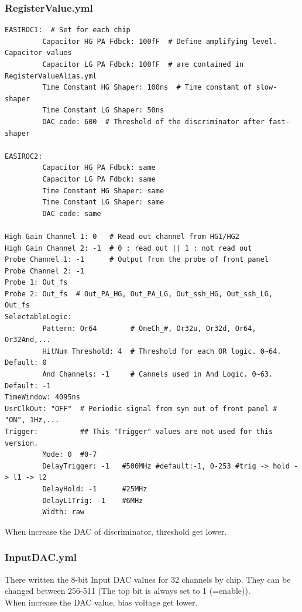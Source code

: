 \subsubsection{RegisterValue.yml}

\begin{shadebox}
\begin{verbatim}
EASIROC1:  # Set for each chip
         Capacitor HG PA Fdbck: 100fF  # Define amplifying level. Capacitor values
         Capacitor LG PA Fdbck: 100fF  # are contained in RegisterValueAlias.yml
         Time Constant HG Shaper: 100ns  # Time constant of slow-shaper
         Time Constant LG Shaper: 50ns
         DAC code: 600  # Threshold of the discriminator after fast-shaper
 
EASIROC2:
         Capacitor HG PA Fdbck: same
         Capacitor LG PA Fdbck: same
         Time Constant HG Shaper: same
         Time Constant LG Shaper: same
         DAC code: same
 
High Gain Channel 1: 0   # Read out channel from HG1/HG2
High Gain Channel 2: -1  # 0 : read out || 1 : not read out
Probe Channel 1: -1      # Output from the probe of front panel
Probe Channel 2: -1
Probe 1: Out_fs
Probe 2: Out_fs  # Out_PA_HG, Out_PA_LG, Out_ssh_HG, Out_ssh_LG, Out_fs
SelectableLogic:
         Pattern: Or64        # OneCh_#, Or32u, Or32d, Or64, Or32And,...
         HitNum Threshold: 4  # Threshold for each OR logic. 0~64. Default: 0
         And Channels: -1     # Cannels used in And Logic. 0~63. Default: -1
TimeWindow: 4095ns
UsrClkOut: "OFF"  # Periodic signal from syn out of front panel # "ON", 1Hz,...
Trigger:          ## This "Trigger" values are not used for this version.
         Mode: 0  #0-7
         DelayTrigger: -1   #500MHz #default:-1, 0-253 #trig -> hold -> l1 -> l2
         DelayHold: -1      #25MHz
         DelayL1Trig: -1    #6MHz
         Width: raw
\end{verbatim}
\end{shadebox}

When increase the DAC of discriminator, threshold get lower.

\subsubsection{InputDAC.yml}
There written the 8-bit Input DAC values for 32 channels by chip. They can be changed between 256-511 (The top bit is always set to 1 (=enable)).\\
When increase the DAC value, bias voltage get lower. 

